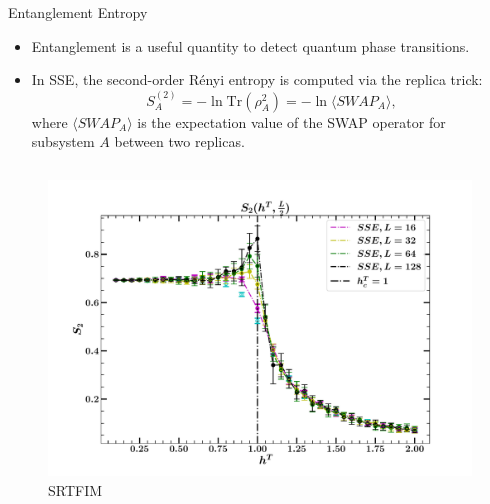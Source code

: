 \documentclass[final,hyperref={pdfpagelabels=false}]{beamer}
\begin{document}
\begin{frame}[t]
\begin{columns}[t]
\begin{column}{.48\textwidth}
\begin{block}{Entanglement Entropy}
\begin{itemize}
\item Entanglement is a useful quantity to detect quantum phase transitions.
\item In SSE, the second-order Rényi entropy is computed via the replica trick:  
\begin{equation}  
S_A^{(2)} = -\ln \text{Tr}(\rho_A^2) = -\ln \langle SWAP_A \rangle,  
\end{equation}  
where \(\langle SWAP_A \rangle\) is the expectation value of the SWAP operator for subsystem \( A \) between two replicas.
\end{itemize}
\begin{columns}[T,onlytextwidth]
\begin{figure}[H]
\centering
\includegraphics[width=1.0\textwidth]{2023-tiwari-espresso-summer-school-poster-session-pimd-main/figures/Entropy_SSE.pdf}
\caption{SRTFIM}
\end{figure}


\end{columns}
\end{block}
\end{column}
\end{columns}
\end{frame}
\end{document}
